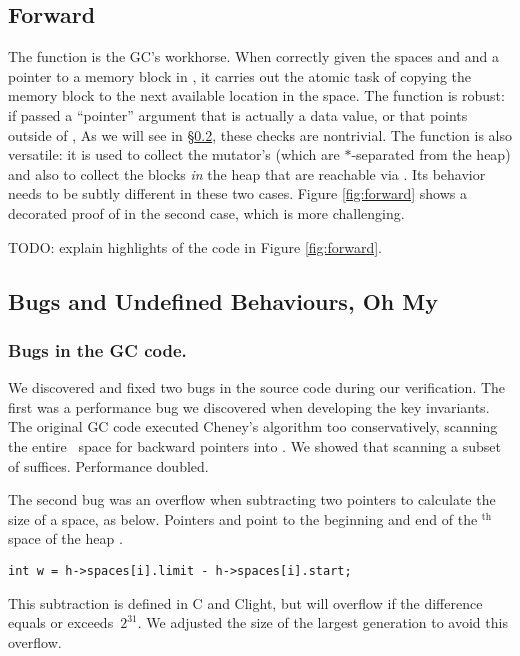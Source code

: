 \subsection{Forward}
\label{sec:gcforward}
The function  is the GC's workhorse.
When correctly given the spaces  and  and a pointer
 to a memory block in ,
it carries out the atomic task of copying the memory block to the next
available location in the  space.
The function is robust: if passed a ``pointer'' argument
that is actually a data value, or that points outside of
, 
As we will see in \S\ref{sec:gcissues}, these checks are nontrivial.
The function is also versatile: it is used to collect the
mutator's  (which are $*$-separated from the heap)
and also to collect the blocks \emph{in} the heap that are reachable via
. Its behavior needs to be subtly different in these
two cases.
Figure \ref{fig:forward} shows a decorated proof of 
in the second case, which is more challenging.

TODO: explain highlights of the code in Figure \ref{fig:forward}.



\subsection{Bugs and Undefined Behaviours, Oh My} \label{sec:gcissues}

\subsubsection*{Bugs in the GC code.}
We discovered and fixed two bugs in the source code during our verification.
The first was a performance bug we discovered when developing the key invariants.
The original GC code executed Cheney's algorithm too conservatively,
scanning the entire~ space for backward pointers into . We
showed that scanning a subset of  suffices.  Performance doubled.

The second bug was an overflow when subtracting two pointers
to calculate the size of a space, as below. Pointers  and 
point to the beginning and end of the $^{\text{th}}$ space of the
heap .
\begin{lstlisting}[numbers=none]
  int w = h->spaces[i].limit - h->spaces[i].start;
\end{lstlisting}
This subtraction is defined in C and Clight, but
will overflow if the difference equals
or exceeds~$2^{31}$. We adjusted the size of the largest generation to avoid this overflow.

